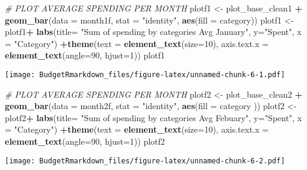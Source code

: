 \documentclass[
]{article}
\newenvironment{Shaded}{\begin{snugshade}}{\end{snugshade}}
\newcommand{\CommentTok}[1]{\textcolor[rgb]{0.56,0.35,0.01}{\textit{#1}}}
\newcommand{\DataTypeTok}[1]{\textcolor[rgb]{0.13,0.29,0.53}{#1}}
\newcommand{\DecValTok}[1]{\textcolor[rgb]{0.00,0.00,0.81}{#1}}
\newcommand{\KeywordTok}[1]{\textcolor[rgb]{0.13,0.29,0.53}{\textbf{#1}}}
\newcommand{\NormalTok}[1]{#1}
\newcommand{\OperatorTok}[1]{\textcolor[rgb]{0.81,0.36,0.00}{\textbf{#1}}}
\newcommand{\StringTok}[1]{\textcolor[rgb]{0.31,0.60,0.02}{#1}}
\begin{document}
\begin{Shaded}
\begin{Highlighting}[]
  \CommentTok{# PLOT AVERAGE SPENDING PER MONTH}
\NormalTok{ plotf1 <-}\StringTok{ }\NormalTok{plot_base_clean1 }\OperatorTok{+}\StringTok{ }\KeywordTok{geom_bar}\NormalTok{(}\DataTypeTok{data =}\NormalTok{ month1f, }\DataTypeTok{stat =} \StringTok{"identity"}\NormalTok{, }\KeywordTok{aes}\NormalTok{(}\DataTypeTok{fill =}\NormalTok{ category))  }
\NormalTok{ plotf1 <-}\StringTok{ }\NormalTok{plotf1}\OperatorTok{+}\StringTok{ }\KeywordTok{labs}\NormalTok{(}\DataTypeTok{title=} \StringTok{"Sum of spending by categories Avg January"}\NormalTok{, }\DataTypeTok{y=}\StringTok{"Spent"}\NormalTok{, }\DataTypeTok{x =} \StringTok{"Category"}\NormalTok{) }\OperatorTok{+}\KeywordTok{theme}\NormalTok{(}\DataTypeTok{text =} \KeywordTok{element_text}\NormalTok{(}\DataTypeTok{size=}\DecValTok{10}\NormalTok{), }\DataTypeTok{axis.text.x =} \KeywordTok{element_text}\NormalTok{(}\DataTypeTok{angle=}\DecValTok{90}\NormalTok{, }\DataTypeTok{hjust=}\DecValTok{1}\NormalTok{)) }
\NormalTok{ plotf1}
\end{Highlighting}
\end{Shaded}

\texttt{[image: BudgetRmarkdown\_files/figure-latex/unnamed-chunk-6-1.pdf]}

\begin{Shaded}
\begin{Highlighting}[]
  \CommentTok{# PLOT AVERAGE SPENDING PER MONTH}
\NormalTok{ plotf2 <-}\StringTok{ }\NormalTok{plot_base_clean2 }\OperatorTok{+}\StringTok{ }\KeywordTok{geom_bar}\NormalTok{(}\DataTypeTok{data =}\NormalTok{ month2f, }\DataTypeTok{stat =} \StringTok{"identity"}\NormalTok{, }\KeywordTok{aes}\NormalTok{(}\DataTypeTok{fill =}\NormalTok{ category ))  }
\NormalTok{ plotf2 <-}\StringTok{ }\NormalTok{plotf2}\OperatorTok{+}\StringTok{ }\KeywordTok{labs}\NormalTok{(}\DataTypeTok{title=} \StringTok{"Sum of spending by categories Avg Febuary"}\NormalTok{, }\DataTypeTok{y=}\StringTok{"Spent"}\NormalTok{, }\DataTypeTok{x =} \StringTok{"Category"}\NormalTok{) }\OperatorTok{+}\KeywordTok{theme}\NormalTok{(}\DataTypeTok{text =} \KeywordTok{element_text}\NormalTok{(}\DataTypeTok{size=}\DecValTok{10}\NormalTok{), }\DataTypeTok{axis.text.x =} \KeywordTok{element_text}\NormalTok{(}\DataTypeTok{angle=}\DecValTok{90}\NormalTok{, }\DataTypeTok{hjust=}\DecValTok{1}\NormalTok{)) }
\NormalTok{ plotf2}
\end{Highlighting}
\end{Shaded}

\texttt{[image: BudgetRmarkdown\_files/figure-latex/unnamed-chunk-6-2.pdf]}
\end{document}

